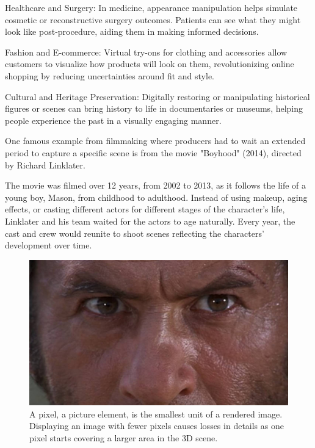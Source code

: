 Healthcare and Surgery: In medicine, appearance manipulation helps simulate cosmetic or reconstructive surgery outcomes. Patients can see what they might look like post-procedure, aiding them in making informed decisions.

Fashion and E-commerce: Virtual try-ons for clothing and accessories allow customers to visualize how products will look on them, revolutionizing online shopping by reducing uncertainties around fit and style.

Cultural and Heritage Preservation: Digitally restoring or manipulating historical figures or scenes can bring history to life in documentaries or museums, helping people experience the past in a visually engaging manner.

One famous example from filmmaking where producers had to wait an extended period to capture a specific scene is from the movie "Boyhood" (2014), directed by Richard Linklater.

The movie was filmed over 12 years, from 2002 to 2013, as it follows the life of a young boy, Mason, from childhood to adulthood. Instead of using makeup, aging effects, or casting different actors for different stages of the character’s life, Linklater and his team waited for the actors to age naturally. Every year, the cast and crew would reunite to shoot scenes reflecting the characters' development over time.

\begin{figure}[ht]
  \centering

    \includegraphics[width=\linewidth]{Images/A scene from ‘The Good, the Bad and the Ugly’ (1966). Image courtesy- Produzioni Europee Associati .jpg}

   \caption{A pixel, a picture element, is the smallest unit of a rendered image. Displaying an image with fewer pixels causes losses in details as one pixel starts covering a larger area in the 3D scene.}
   \label{fig:colour-approximate}
\end{figure}


